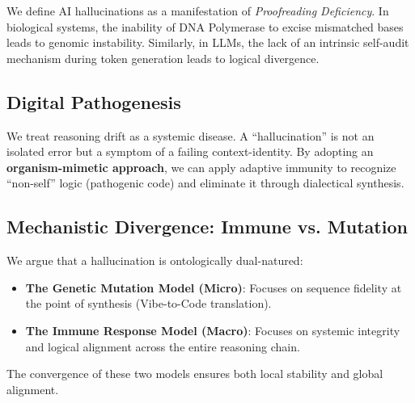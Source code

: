 We define AI hallucinations as a manifestation of \textit{Proofreading Deficiency}. In biological systems, the inability of DNA Polymerase to excise mismatched bases leads to genomic instability. Similarly, in LLMs, the lack of an intrinsic self-audit mechanism during token generation leads to logical divergence.

\subsection{Digital Pathogenesis}
We treat reasoning drift as a systemic disease. A ``hallucination'' is not an isolated error but a symptom of a failing context-identity. By adopting an \textbf{organism-mimetic approach}, we can apply adaptive immunity to recognize ``non-self'' logic (pathogenic code) and eliminate it through dialectical synthesis.

\subsection{Mechanistic Divergence: Immune vs. Mutation}
We argue that a hallucination is ontologically dual-natured:
\begin{itemize}
    \item \textbf{The Genetic Mutation Model (Micro)}: Focuses on sequence fidelity at the point of synthesis (Vibe-to-Code translation).
    \item \textbf{The Immune Response Model (Macro)}: Focuses on systemic integrity and logical alignment across the entire reasoning chain.
\end{itemize}
The convergence of these two models ensures both local stability and global alignment.
